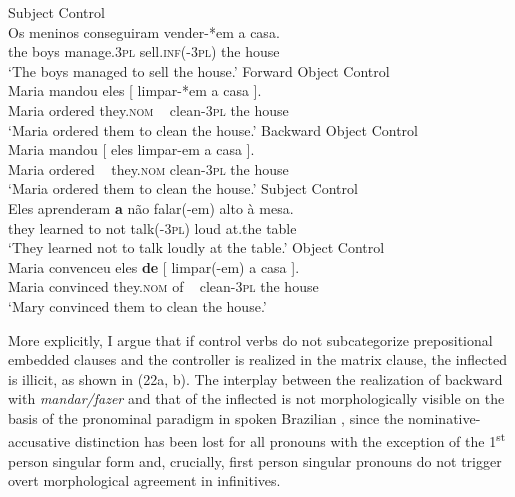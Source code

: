 \documentclass[output=paper]{langsci/langscibook}
\begin{document}
\ea%
    \label{ex:moreno:22}
    \ea  Subject Control\\ 
    \gll Os meninos  conseguiram  vender-*em   a casa.  \\
         the boys  manage.\textsc{3pl}   sell.\textsc{inf}(-\textsc{3pl}) the house\\
    \glt ‘The boys managed to sell the house.’
    \ex  Forward Object Control\\
    \gll Maria mandou   eles    [ limpar-*em a    casa ].    \\
         Maria ordered    they.\textsc{nom}  ~ clean{}-\textsc{3pl}     the house\\
    \glt ‘Maria ordered them  to clean the house.’
    \ex  Backward Object Control\\
    \gll Maria mandou       [ eles limpar-em a        casa ].    \\
         Maria ordered      ~    they.\textsc{nom}   clean{}-\textsc{3pl}     the house\\
    \glt ‘Maria ordered them to clean the house.’
    \z
\z
\ea%
    \label{ex:moreno:23}
    \ea  Subject Control\\
    \gll Eles     aprenderam \textbf{a}  não   falar(-em)  alto  à        mesa.\\
         they    learned         to not    talk({}-\textsc{3pl})    loud at.the table  \\
    \glt ‘They learned not to talk loudly at the table.’
    \ex  Object Control\\
    \gll Maria  convenceu eles          \textbf{de}  [  limpar(-em) a    casa ].     \\
         Maria  convinced they.\textsc{nom} of    ~ clean-\textsc{3pl}     the house\\
    \glt ‘Mary convinced them to clean the house.’
    \z
\z

More explicitly, I argue that if control verbs do not subcategorize prepositional embedded clauses and the controller is realized in the matrix clause, the inflected  is illicit, as shown in (22a, b). The interplay between the realization of backward  with \textit{mandar\slash fazer} and that of the inflected  is not morphologically visible on the basis of the pronominal paradigm in spoken Brazilian , since the nominative-accusative distinction has been lost for all pronouns with the exception of the 1\textsuperscript{st} person singular form and, crucially, first person singular pronouns do not trigger overt morphological agreement in infinitives. 
\end{document}
